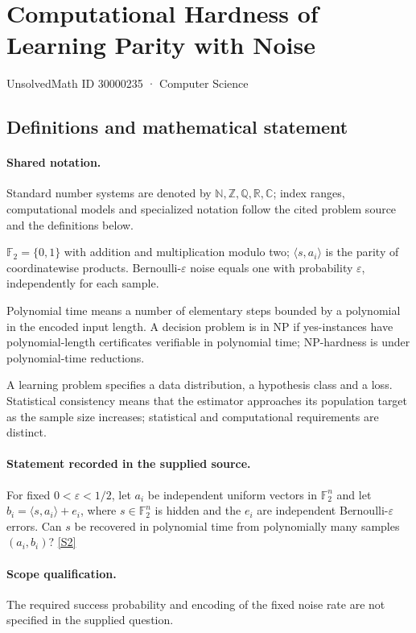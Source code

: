 \documentclass[11pt]{article}
\newcommand{\sref}[2]{\hyperlink{source:#1:#2}{[S#2]}}
\begin{document}
\setcounter{section}{30000234}
\section{Computational Hardness of Learning Parity with Noise}\label{30000235}
{\small\sffamily UnsolvedMath ID 30000235 · Computer Science}
\subsection{Definitions and mathematical statement}

\paragraph{Shared notation.}Standard number systems are denoted by $\mathbb N,\mathbb Z,\mathbb Q,\mathbb R,\mathbb C$; index ranges, computational models and specialized notation follow the cited problem source and the definitions below.


$\mathbb F_2=\{0,1\}$ with addition and multiplication modulo two; $\langle s,a_i\rangle$ is the parity of coordinatewise products. Bernoulli-$\varepsilon$ noise equals one with probability $\varepsilon$, independently for each sample.

Polynomial time means a number of elementary steps bounded by a polynomial in the encoded input length. A decision problem is in $\mathrm{NP}$ if yes-instances have polynomial-length certificates verifiable in polynomial time; NP-hardness is under polynomial-time reductions.

A learning problem specifies a data distribution, a hypothesis class and a loss. Statistical consistency means that the estimator approaches its population target as the sample size increases; statistical and computational requirements are distinct.
\paragraph{Statement recorded in the supplied source.}
For fixed $0<\varepsilon<1/2$, let $a_i$ be independent uniform vectors in $\mathbb F_2^n$ and let $b_i=\langle s,a_i\rangle+e_i$, where $s\in\mathbb F_2^n$ is hidden and the $e_i$ are independent Bernoulli-$\varepsilon$ errors. Can $s$ be recovered in polynomial time from polynomially many samples $(a_i,b_i)$? \sref{30000235}{2}
\paragraph{Scope qualification.}
The required success probability and encoding of the fixed noise rate are not specified in the supplied question.
\end{document}
